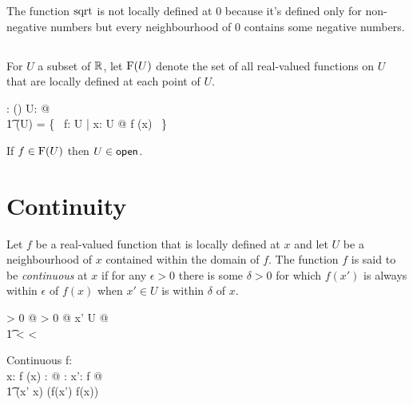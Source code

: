 \documentclass[11pt, oneside]{article}
\begin{document}
\begin{remark}
The function $\operatorname{sqrt}$ is not locally defined at $0$ because it's defined only for non-negative numbers
but every neighbourhood of $0$ contains some negative numbers.
\end{remark}

\subsection{}

For $U$ a subset of $\mathbb{R}$,
let $\operatorname{F}(U)$ denote the set of all real-valued functions on $U$ that are locally defined at each point of $U$.

\begin{axdef}
	\FunPR: \power \R \fun \power (\R \pfun \R)
\where
	\forall U: \power \R @ \\
	\t1	\FunPR(U) = \{~ f: U \fun \R | \forall x: U @ f \in \FunR(x) ~\}
\end{axdef}

\begin{remark}
If $f \in \operatorname{F}(U)$ then $U \in \mathsf{open}$.
\end{remark}

\section{Continuity}

Let $f$ be a real-valued function that is locally defined at $x$ and let $U$ be a neighbourhood of $x$
contained within the domain of $f$.
The function $f$ is said to be {\it continuous} at $x$ if 
for any $\epsilon > 0$ there is some $\delta > 0$ for which 
$f(x')$ is always within $\epsilon$ of $f(x)$
when $x' \in U$ is within $\delta$ of $x$.
\begin{argue}
\forall \epsilon > 0 @ \exists \delta > 0 @ \forall x' \in U @ \\
\t1	 < \delta \implies {} < \epsilon
\end{argue}

\begin{schema}{Continuous}
	f: \R \pfun \R \\
	x: \R
\where
	f \in \FunR(x)
\also
	\forall \epsilon: \Rpos @ \exists \delta: \Rpos@ \forall x': \dom f @ \\
	\t1	\absR(x' \subR x) \ltR \delta \implies \absR(f(x') \subR f(x)) \ltR \epsilon
\end{schema}

\subsection{}
\end{document}
